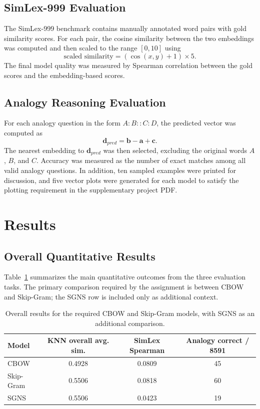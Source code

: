 \documentclass[11pt,a4paper]{article}
\begin{document}
\subsection{SimLex-999 Evaluation}
The SimLex-999 benchmark contains manually annotated word pairs with gold similarity scores. For each pair, the cosine similarity between the two embeddings was computed and then scaled to the range $[0,10]$ using
\[
\text{scaled similarity} = (\cos(x,y) + 1) \times 5.
\]
The final model quality was measured by Spearman correlation between the gold scores and the embedding-based scores.

\subsection{Analogy Reasoning Evaluation}
For each analogy question in the form $A:B::C:D$, the predicted vector was computed as
\[
\mathbf{d}_{pred} = \mathbf{b} - \mathbf{a} + \mathbf{c}.
\]
The nearest embedding to $\mathbf{d}_{pred}$ was then selected, excluding the original words $A$, $B$, and $C$. Accuracy was measured as the number of exact matches among all valid analogy questions. In addition, ten sampled examples were printed for discussion, and five vector plots were generated for each model to satisfy the plotting requirement in the supplementary project PDF.

\section{Results}
\subsection{Overall Quantitative Results}
Table~\ref{tab:overall-results} summarizes the main quantitative outcomes from the three evaluation tasks. The primary comparison required by the assignment is between CBOW and Skip-Gram; the SGNS row is included only as additional context.

\begin{table}[H]
    \centering
    \caption{Overall results for the required CBOW and Skip-Gram models, with SGNS as an additional comparison.}
    \label{tab:overall-results}
    \begin{tabular}{lccc}
        \toprule
        Model & KNN overall avg. sim. & SimLex Spearman & Analogy correct / 8591 \\
        \midrule
        CBOW & 0.4928 & 0.0809 & 45 \\
        Skip-Gram & 0.5506 & 0.0818 & 60 \\
        SGNS & 0.5506 & 0.0423 & 19 \\
        \bottomrule
    \end{tabular}
\end{table}
\end{document}

